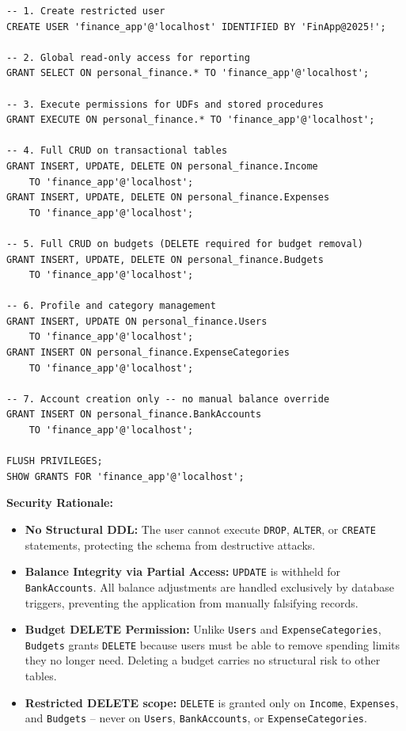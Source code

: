\documentclass[12pt, a4paper]{article}
\begin{document}
\begin{lstlisting}[style=sqlstyle, caption={Security Configuration and Granular Permissions}]
-- 1. Create restricted user
CREATE USER 'finance_app'@'localhost' IDENTIFIED BY 'FinApp@2025!';

-- 2. Global read-only access for reporting
GRANT SELECT ON personal_finance.* TO 'finance_app'@'localhost';

-- 3. Execute permissions for UDFs and stored procedures
GRANT EXECUTE ON personal_finance.* TO 'finance_app'@'localhost';

-- 4. Full CRUD on transactional tables
GRANT INSERT, UPDATE, DELETE ON personal_finance.Income
    TO 'finance_app'@'localhost';
GRANT INSERT, UPDATE, DELETE ON personal_finance.Expenses
    TO 'finance_app'@'localhost';

-- 5. Full CRUD on budgets (DELETE required for budget removal)
GRANT INSERT, UPDATE, DELETE ON personal_finance.Budgets
    TO 'finance_app'@'localhost';

-- 6. Profile and category management
GRANT INSERT, UPDATE ON personal_finance.Users
    TO 'finance_app'@'localhost';
GRANT INSERT ON personal_finance.ExpenseCategories
    TO 'finance_app'@'localhost';

-- 7. Account creation only -- no manual balance override
GRANT INSERT ON personal_finance.BankAccounts
    TO 'finance_app'@'localhost';

FLUSH PRIVILEGES;
SHOW GRANTS FOR 'finance_app'@'localhost';
\end{lstlisting}

\textbf{Security Rationale:}
\begin{itemize}
\item \textbf{No Structural DDL:} The user cannot execute \texttt{DROP}, \texttt{ALTER},
      or \texttt{CREATE} statements, protecting the schema from destructive attacks.
\item \textbf{Balance Integrity via Partial Access:} \texttt{UPDATE} is withheld for
      \texttt{BankAccounts}. All balance adjustments are handled exclusively by
      database triggers, preventing the application from manually falsifying records.
\item \textbf{Budget DELETE Permission:} Unlike \texttt{Users} and
      \texttt{ExpenseCategories}, \texttt{Budgets} grants \texttt{DELETE} because
      users must be able to remove spending limits they no longer need.
      Deleting a budget carries no structural risk to other tables.
\item \textbf{Restricted DELETE scope:} \texttt{DELETE} is granted only on
      \texttt{Income}, \texttt{Expenses}, and \texttt{Budgets} -- never on
      \texttt{Users}, \texttt{BankAccounts}, or \texttt{ExpenseCategories}.
\end{itemize}
\end{document}
